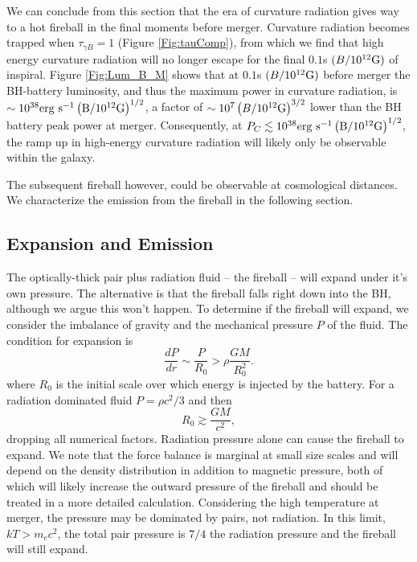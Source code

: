 We can conclude from this section that the era of curvature radiation
gives way to a hot fireball in the final moments before
merger. Curvature radiation becomes trapped when $\tau_{\gamma B}=1$
(Figure \ref{Fig:tauComp}), from which we find that high energy
curvature radiation will no longer escape for the final $0.1$s
$(B/10^{12}\rm{G})$ of inspiral. Figure \ref{Fig:Lum_B_M} shows that at 
$0.1$s $(B/10^{12}\rm{G})$ before merger the BH-battery luminosity, 
and thus the maximum power in curvature radiation, is $\sim 10^{38} \rm{erg} \ \rm{s}^{-1}
\left(B/10^{12}\rm{G}\right)^{1/2}$, a factor of $\sim 10^7
\left(B/10^{12}\rm{G}\right)^{3/2}$ lower than the BH battery peak
power at merger. Consequently, at $P_{C} \lesssim 10^{38} \rm{erg} \ \rm{s}^{-1}
\left(B/10^{12}\rm{G}\right)^{1/2}$, the ramp up in high-energy curvature radiation
will likely only be observable within the galaxy. 

The subsequent
fireball however, could be observable at cosmological distances. We
characterize the emission from the fireball in the following section.






\subsection{Expansion and Emission}
The optically-thick pair plus radiation fluid -- the fireball -- will
expand under it's own pressure. The alternative is that the fireball
falls right down into the BH, although we argue this won't happen.  To
determine if the fireball will expand, we consider the imbalance of
gravity and the mechanical pressure $P$ of the fluid. The condition
for expansion is
\begin{equation}
\frac{dP}{dr}\sim \frac{P}{R_0} > \rho \frac{GM}{R_0^2}.
\label{Eq:PGbal}
\end{equation}
where $R_0$ is the initial scale over which energy is injected by the
battery. For a radiation dominated fluid $P=\rho c^2/3$ and then
\begin{equation}
R_0 \gtrsim  \frac{GM}{c^2},
\end{equation}
dropping all numerical factors. Radiation pressure alone can cause the fireball to expand. We note that the force balance is marginal at small size scales and will depend on the density distribution in addition to magnetic pressure, both of which will likely increase the outward pressure of the fireball and should be treated in a more detailed calculation.
Considering the high temperature at
merger, the pressure may be dominated by pairs, not
radiation. In this limit, $kT > m_e c^2$, the total pair
pressure is $7/4$ the radiation pressure and the fireball will still expand.


